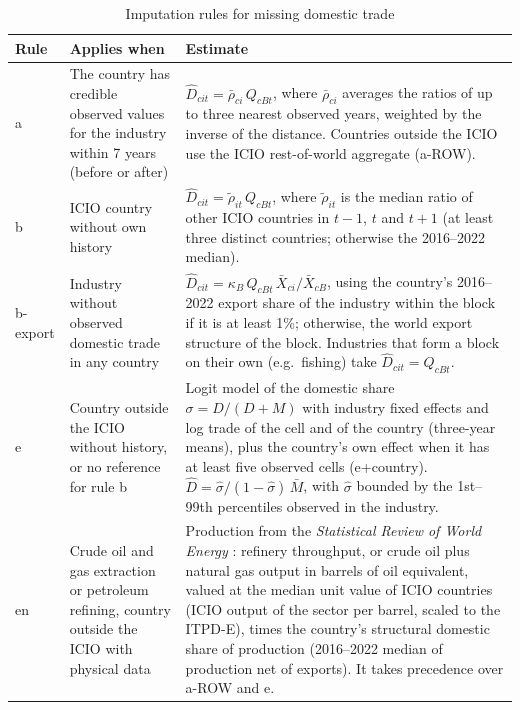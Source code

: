 \documentclass[final,1p,times,authoryear]{elsarticle}
\begin{document}
\begin{table}[!t]
\caption{Imputation rules for missing domestic trade}\label{tab:diag-rules}
\centering
\footnotesize
\begin{tabularx}{\textwidth}{@{}p{1.6cm}p{4.4cm}X@{}}
\toprule
\textbf{Rule} & \textbf{Applies when} & \textbf{Estimate} \\
\midrule
a & The country has credible observed values for the industry within 7 years (before or after) & $\hat D_{cit} = \bar\rho_{ci}\, Q_{cBt}$, where $\bar\rho_{ci}$ averages the ratios of up to three nearest observed years, weighted by the inverse of the distance. Countries outside the ICIO use the ICIO rest-of-world aggregate (a-ROW). \\
b & ICIO country without own history & $\hat D_{cit} = \tilde\rho_{it}\, Q_{cBt}$, where $\tilde\rho_{it}$ is the median ratio of other ICIO countries in $t-1$, $t$ and $t+1$ (at least three distinct countries; otherwise the 2016--2022 median). \\
b-export & Industry without observed domestic trade in any country & $\hat D_{cit} = \kappa_B\, Q_{cBt}\, \bar X_{ci}/\bar X_{cB}$, using the country's 2016--2022 export share of the industry within the block if it is at least 1\%; otherwise, the world export structure of the block. Industries that form a block on their own (e.g.\ fishing) take $\hat D_{cit} = Q_{cBt}$. \\
e & Country outside the ICIO without history, or no reference for rule b & Logit model of the domestic share $\sigma = D/(D+M)$ with industry fixed effects and log trade of the cell and of the country (three-year means), plus the country's own effect when it has at least five observed cells (e+country). $\hat D = \hat\sigma/(1-\hat\sigma)\,\bar M$, with $\hat\sigma$ bounded by the 1st--99th percentiles observed in the industry. \\
en & Crude oil and gas extraction or petroleum refining, country outside the ICIO with physical data & Production from the \emph{Statistical Review of World Energy} \citep{EIStatReview}: refinery throughput, or crude oil plus natural gas output in barrels of oil equivalent, valued at the median unit value of ICIO countries (ICIO output of the sector per barrel, scaled to the ITPD-E), times the country's structural domestic share of production (2016--2022 median of production net of exports). It takes precedence over a-ROW and e. \\
\bottomrule
\end{tabularx}
\end{table}
\end{document}
